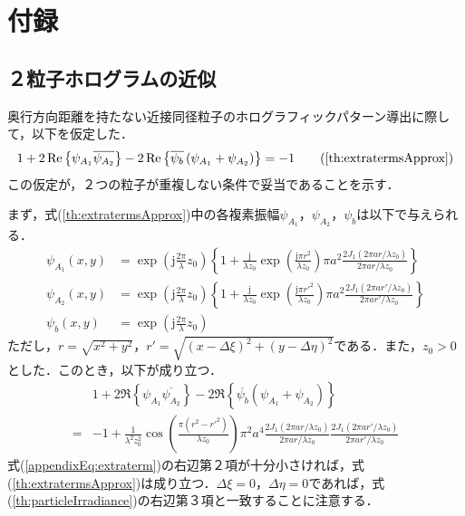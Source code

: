 \appendix
{}
\section*{付録}

\renewcommand{\thesubsection}{\Alph{subsection}}
\subsection{２粒子ホログラムの近似}
\label{sec:appendix_2particle}
奥行方向距離を持たない近接同径粒子のホログラフィックパターン導出に際して，以下を仮定した．
\begin{equation}
    1 + 2\Re \left\{ \psi_{A_1} \overline{\psi_{A_2}} \right\} - 2\Re \left\{\overline{\psi_b}\left( \psi_{A_1} + \psi_{A_2} \right)\right\} = -1
    \tag{\ref{th:extratermsApprox}}
\end{equation}
この仮定が，２つの粒子が重複しない条件で妥当であることを示す．

まず，式(\ref{th:extratermsApprox})中の各複素振幅$\psi_{A_1}$，$\psi_{A_2}$，$\psi_{b}$は以下で与えられる．
\begin{align}
    \psi_{A_1}(x,y) &= \exp{\left(\mathrm{j}\frac{2\pi}{\lambda}z_0\right)} \left\{ 1 + \frac{\mathrm{j}}{\lambda z_0} \exp{ \left( \frac{\mathrm{j} \pi r^2}{\lambda z_0} \right)} \pi a^2 \frac{2J_1(2\pi a r/ \lambda z_0)}{2\pi a r/ \lambda z_0}  \right\} \\
    \psi_{A_2}(x,y) &= \exp{\left(\mathrm{j}\frac{2\pi}{\lambda}z_0\right)} \left\{ 1 + \frac{\mathrm{j}}{\lambda z_0} \exp{ \left( \frac{\mathrm{j} \pi r'^2}{\lambda z_0} \right)} \pi a^2 \frac{2J_1(2\pi a r'/ \lambda z_0)}{2\pi a r'/ \lambda z_0}  \right\} \\
    \psi_b(x,y) &= \exp{\left(\mathrm{j}\frac{2\pi}{\lambda}z_0\right)}
\end{align}
ただし，$r = \sqrt{x^2 + y^2}$，$r' = \sqrt{(x-\Delta \xi)^2 + (y-\Delta \eta)^2}$である．また，$z_0>0$とした．このとき，以下が成り立つ．
\begin{align}
    &1 + 2\Re \left\{ \psi_{A_1} \overline{\psi_{A_2}} \right\} - 2\Re \left\{\overline{\psi_b}\left( \psi_{A_1} + \psi_{A_2} \right)\right\} \\
    =& -1 + \frac{1}{\lambda^2 z_0^2} \cos{\left( \frac{\pi \left( r^2-r'^2 \right)}{\lambda z_0} \right) \pi^2 a^4  \frac{2J_1(2\pi a r/ \lambda z_0)}{2\pi a r/ \lambda z_0} \frac{2J_1(2\pi a r'/ \lambda z_0)}{2\pi a r'/ \lambda z_0}}
    \label{appendixEq:extraterm}
\end{align}
式(\ref{appendixEq:extraterm})の右辺第２項が十分小さければ，式(\ref{th:extratermsApprox})は成り立つ．$\Delta \xi =0$，$\Delta \eta=0$であれば，式(\ref{th:particleIrradiance})の右辺第３項と一致することに注意する．

